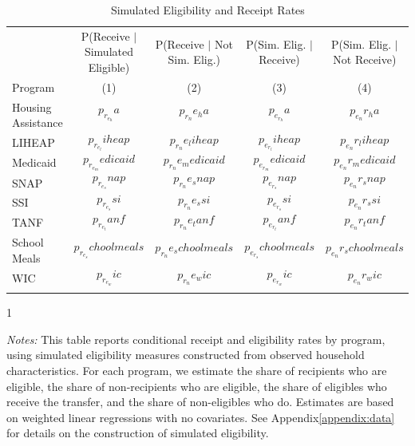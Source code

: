 \begin{table}[ht!]
  \centering
  \caption{Simulated Eligibility and Receipt Rates}
  \label{tab:welfare_slope}\small
  \begin{tabular*}{1.36\textwidth}{@{\extracolsep{\fill}}lcccc@{}}
  \toprule
\addlinespace 
& P(Receive $|$ Simulated Eligible) & P(Receive $|$ Not Sim. Elig.) &
P(Sim. Elig. $|$ Receive) & P(Sim. Elig. $|$ Not Receive) \\ 
Program   & (1) & (2) & (3) & (4) \\ \addlinespace
\hline \addlinespace
Housing Assistance & $$p_r_e_ha$$ & $$p_r_ne_ha$$ & $$p_e_r_ha$$
& $$p_e_nr_ha$$ \\
LIHEAP & $$p_r_e_liheap$$ & $$p_r_ne_liheap$$ & $$p_e_r_liheap$$
& $$p_e_nr_liheap$$ \\ 
Medicaid & $$p_r_e_medicaid$$ & $$p_r_ne_medicaid$$ & $$p_e_r_medicaid$$
& $$p_e_nr_medicaid$$ \\ 
SNAP & $$p_r_e_snap$$ & $$p_r_ne_snap$$ & $$p_e_r_snap$$
& $$p_e_nr_snap$$ \\
SSI & $$p_r_e_ssi$$ & $$p_r_ne_ssi$$ & $$p_e_r_ssi$$
& $$p_e_nr_ssi$$ \\ 
TANF & $$p_r_e_tanf$$ & $$p_r_ne_tanf$$ & $$p_e_r_tanf$$
& $$p_e_nr_tanf$$ \\
School Meals & $$p_r_e_schoolmeals$$ & $$p_r_ne_schoolmeals$$ & $$p_e_r_schoolmeals$$
& $$p_e_nr_schoolmeals$$ \\ 
WIC & $$p_r_e_wic$$ & $$p_r_ne_wic$$ & $$p_e_r_wic$$
& $$p_e_nr_wic$$ \\   \addlinespace \bottomrule
\end{tabular*}
\begin{spacing}{1}
\begin{tablenotes}
\item \footnotesize \textit{Notes:} This table reports conditional receipt and eligibility rates by program, using simulated eligibility measures constructed from observed household characteristics. For each program, we estimate the share of recipients who are eligible, the share of non-recipients who are eligible, the share of eligibles who receive the transfer, and the share of non-eligibles who do. Estimates are based on weighted linear regressions with no covariates. See Appendix\ref{appendix:data} for details on the construction of simulated eligibility.
\end{tablenotes}
\end{spacing}
\end{table}
